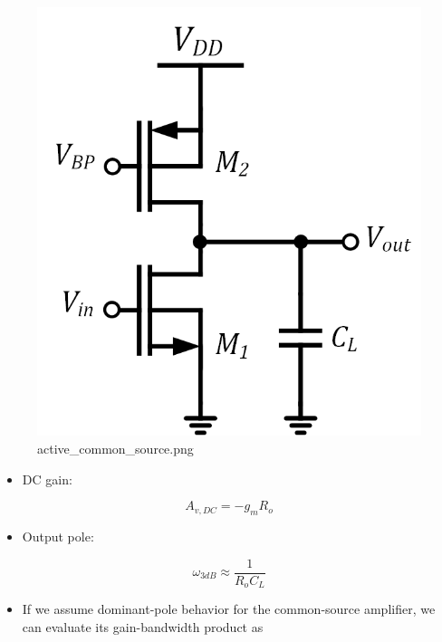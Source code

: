 \documentclass[11pt]{article}
\providecommand{\tightlist}{%
      \setlength{\itemsep}{0pt}\setlength{\parskip}{0pt}}
\begin{document}
    \begin{figure}
\centering
\includegraphics{active_common_source.png}
\caption{active\_common\_source.png}
\end{figure}

    \begin{itemize}
\tightlist
\item
  DC gain:
\end{itemize}

\begin{equation}
A_{v,DC} = -g_m R_o
\end{equation}

\begin{itemize}
\tightlist
\item
  Output pole:
\end{itemize}

\begin{equation}
\omega_{3dB} \approx \dfrac{1}{R_o C_L}
\end{equation}

    \begin{itemize}
\tightlist
\item
  If we assume dominant-pole behavior for the common-source amplifier,
  we can evaluate its gain-bandwidth product as
\end{itemize}
\end{document}
